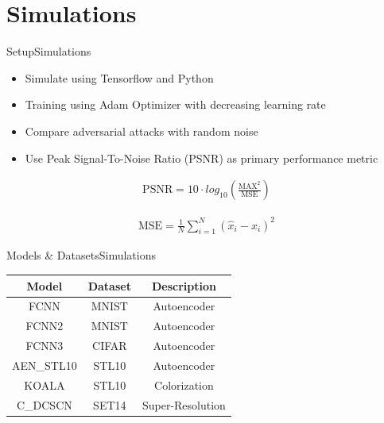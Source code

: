 \documentclass[xcolor={cmyk}]{beamer}
\begin{document}
\section{Simulations}
\begin{frame}{Setup}{Simulations}

	\begin{itemize}
		\item Simulate using Tensorflow and Python
		\item Training using Adam Optimizer with decreasing learning rate
		\item Compare adversarial attacks with random noise
		\item Use Peak Signal-To-Noise Ratio (PSNR) as primary performance metric
	\end{itemize}

	\begin{equation*}
	\begin{aligned}
		\text{PSNR} = 10 \cdot log_{10} (\frac{\text{MAX}^2}{\text{MSE}})
	\end{aligned}
	\label{07_psnr_definition}
	\end{equation*}

	\begin{equation*}
	\begin{aligned}
		\text{MSE} = \frac{1}{N} \sum_{i=1}^N (\hat{x}_i - x_i)^2
	\end{aligned}
	\label{07_mse_definition}
	\end{equation*}

\end{frame}


\begin{frame}{Models \& Datasets}{Simulations}

	\begin{table}[]
	\centering
	\def\arraystretch{1.8}
	\label{ModelTable}
	\begin{tabular}{|c|c|c|}
	\hline
	\textbf{Model} & \textbf{Dataset} & \textbf{Description}\\ \hline
	FCNN           & MNIST            & Autoencoder         \\ \hline
	FCNN2          & MNIST            & Autoencoder         \\ \hline
	FCNN3          & CIFAR            & Autoencoder         \\ \hline
	AEN\_STL10     & STL10            & Autoencoder         \\ \hline
	KOALA          & STL10            & Colorization        \\ \hline
	C\_DCSCN       & SET14            & Super-Resolution    \\ \hline
	\end{tabular}
	\end{table}

\end{frame}
\end{document}
